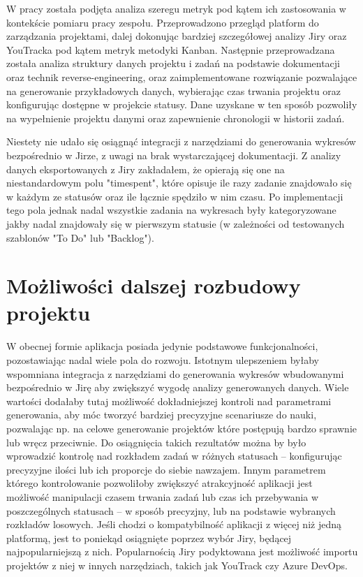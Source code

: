 W pracy została podjęta analiza szeregu metryk pod kątem ich zastosowania w kontekście pomiaru pracy zespołu.
Przeprowadzono przegląd platform do zarządzania projektami, dalej dokonując bardziej szczegółowej analizy Jiry oraz YouTracka pod kątem
metryk metodyki Kanban.
Następnie przeprowadzana została analiza struktury danych projektu i zadań na podstawie dokumentacji oraz technik reverse-engineering, oraz zaimplementowane rozwiązanie
pozwalające na generowanie przykładowych danych, wybierając czas trwania projektu oraz konfigurując dostępne w projekcie statusy.
Dane uzyskane w ten sposób pozwoliły na wypełnienie projektu danymi oraz zapewnienie chronologii w historii zadań.

Niestety nie udało się osiągnąć integracji z narzędziami do generowania wykresów bezpośrednio w Jirze, z uwagi na brak wystarczającej dokumentacji.
Z analizy danych eksportowanych z Jiry zakładałem, że opierają się one na niestandardowym polu "timespent", które opisuje ile razy zadanie znajdowało się w każdym ze statusów
oraz ile łącznie spędziło w nim czasu. Po implementacji tego pola jednak nadal wszystkie zadania na wykresach były kategoryzowane jakby nadal znajdowały się w pierwszym statusie (w zależności
od testowanych szablonów "To Do" lub "Backlog").

\section*{Możliwości dalszej rozbudowy projektu}
W obecnej formie aplikacja posiada jedynie podstawowe funkcjonalności, pozostawiając nadal wiele pola do rozwoju.
Istotnym ulepszeniem byłaby wspomniana integracja z narzędziami do generowania wykresów wbudowanymi bezpośrednio w Jirę aby zwiększyć wygodę analizy generowanych danych.
Wiele wartości dodałaby tutaj możliwość dokładniejszej kontroli nad parametrami generowania, aby móc tworzyć bardziej precyzyjne scenariusze do nauki, pozwalając np. na celowe generowanie projektów
które postępują bardzo sprawnie lub wręcz przeciwnie. Do osiągnięcia takich rezultatów można by było wprowadzić kontrolę nad rozkładem zadań w różnych statusach -- konfigurując precyzyjne ilości lub
ich proporcje do siebie nawzajem. Innym parametrem którego kontrolowanie pozwoliłoby zwiększyć atrakcyjność aplikacji jest możliwość manipulacji czasem trwania zadań lub czas ich przebywania w 
poszczególnych statusach -- w sposób precyzjny, lub na podstawie wybranych rozkładów losowych.
Jeśli chodzi o kompatybilność aplikacji z więcej niż jedną platformą, jest to poniekąd osiągnięte poprzez wybór Jiry, będącej najpopularniejszą z nich.
Popularnością Jiry podyktowana jest możliwość importu projektów z niej w innych narzędziach, takich jak YouTrack czy Azure DevOps.

